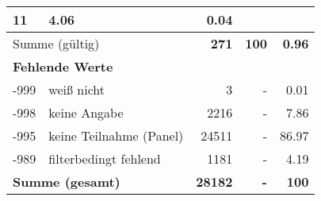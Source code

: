 \begin{longtable}{lXrrr}
       \num{11} &
       \num[round-mode=places,round-precision=2]{4,06} &
         \num[round-mode=places,round-precision=2]{0,04} \\
     \midrule
     \multicolumn{2}{l}{Summe (gültig)} &
       \textbf{\num{271}} &
     \textbf{100} &
       \textbf{\num[round-mode=places,round-precision=2]{0,96}} \\
     \multicolumn{5}{l}{\textbf{Fehlende Werte}}\\
       -999 &
       weiß nicht &
         \num{3} &
        - &
         \num[round-mode=places,round-precision=2]{0,01} \\
       -998 &
       keine Angabe &
         \num{2216} &
        - &
         \num[round-mode=places,round-precision=2]{7,86} \\
       -995 &
       keine Teilnahme (Panel) &
         \num{24511} &
        - &
         \num[round-mode=places,round-precision=2]{86,97} \\
       -989 &
       filterbedingt fehlend &
         \num{1181} &
        - &
         \num[round-mode=places,round-precision=2]{4,19} \\
     \midrule
     \multicolumn{2}{l}{\textbf{Summe (gesamt)}} &
          \textbf{\num{28182}} &
        \textbf{-} &
        \textbf{100} \\
     \bottomrule
     \end{longtable}
     
